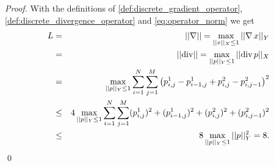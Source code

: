     \begin{proof} %

        With the definitions of \ref{def:discrete_gradient_operator}, \ref{def:discrete_divergence_operator} and \ref{eq:operator_norm} we get
            \begin{eqnarray}
                L &=& ||\nabla|| = \max_{||x||_{X} \le 1} ||\nabla\,x||_{Y} \notag \\
                &=& ||\textnormal{div}|| = \max_{||p||_{Y} \le 1} ||\textnormal{div}\,p||_{X} \notag \\
                &=& \max_{||p||_{Y} \le 1} \sum_{i = 1}^{N} \sum_{j = 1}^{M} \big( p^{1}_{i, j} - p^{1}_{i-1, j} + p^{2}_{i, j} - p^{2}_{i, j-1} \big)^{2} \notag \\
                &\le& 4 \max_{||p||_{Y} \le 1} \sum_{i = 1}^{N} \sum_{j = 1}^{M} (p^{1}_{i, j})^{2} + (p^{1}_{i-1, j})^{2} + (p^{2}_{i, j})^{2} + (p^{2}_{i, j-1})^{2} \notag \\
                &\le& 8 \max_{||p||_{Y} \le 1} ||p||^{2}_{Y} = 8.
                \label{eq:bound_on_discrete_gradient}
            \end{eqnarray}\qed
    \end{proof}

